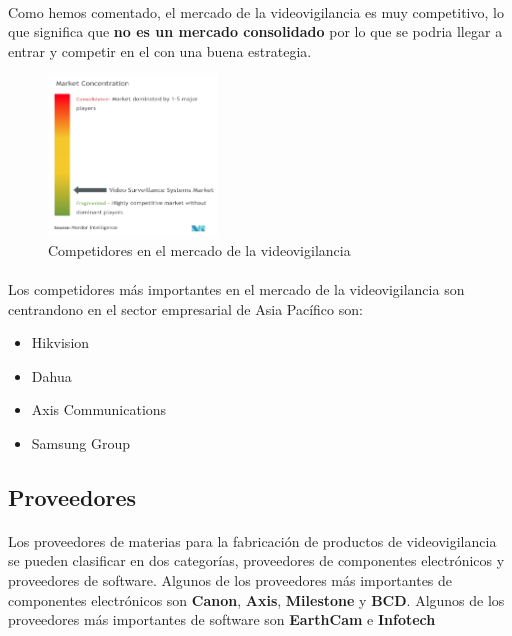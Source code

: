 \documentclass{report}
\begin{document}
          \paragraph*{}{Como hemos comentado, el mercado de la videovigilancia es muy competitivo, lo que significa que \textbf{no es un mercado consolidado} por lo que se podria llegar a entrar y competir en el con una buena estrategia.}
          \begin{figure}[H]
            \centering
            \includegraphics[width=0.4\textwidth]{./img/competidores.png}
            \caption{Competidores en el mercado de la videovigilancia}
          \end{figure}
          \paragraph*{}{Los competidores más importantes en el mercado de la videovigilancia son centrandono en el sector empresarial de Asia Pacífico son:}
          \begin{multicols}{2}
            \begin{itemize}
              \item Hikvision
              \item Dahua
              \item Axis Communications
              \item Samsung Group
            \end{itemize}
          \end{multicols}
        \subsection{Proveedores}
          \paragraph*{}
          {
            Los proveedores de materias para la fabricación de productos de videovigilancia se pueden clasificar en dos categorías, proveedores de componentes electrónicos y proveedores de software. 
            Algunos de los proveedores más importantes de componentes electrónicos son \textbf{Canon}, \textbf{Axis}, \textbf{Milestone} y \textbf{BCD}. 
            Algunos de los proveedores más importantes de software son \textbf{EarthCam} e \textbf{Infotech}
          }
\end{document}
